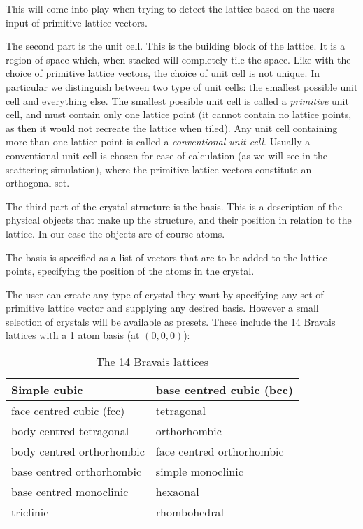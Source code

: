 \documentclass[main.tex]{subfiles}
\begin{document}
	This will come into play when trying to detect the lattice based on the users input of primitive lattice vectors. 
	
	The second part is the unit cell. This is the building block of the lattice. It is a region of space which, when stacked will completely tile the space. Like with the choice of primitive lattice vectors, the choice of unit cell is not unique. In particular we distinguish between two type of unit cells: the smallest possible unit cell and everything else. The smallest possible unit cell is called a \textit{primitive} unit cell, and must contain only one lattice point (it cannot contain no lattice points, as then it would not recreate the lattice when tiled). Any unit cell containing more than one lattice point is called a \textit{conventional unit cell}. Usually a conventional unit cell is chosen for ease of calculation (as we will see in the scattering simulation), where the primitive lattice vectors constitute an orthogonal set.
	
	The third part of the crystal structure is the basis. This is a description of the physical objects that make up the structure, and their position in relation to the lattice. In our case the objects are of course atoms. 
	
	The basis is specified as a list of vectors that are to be added to the lattice points, specifying the position of the atoms in the crystal.
	
	The user can create any type of crystal they want by specifying any set of primitive lattice vector and supplying any desired basis. However a small selection of crystals will be available as presets. These include the 14 Bravais lattices with a 1 atom basis (at $ (0,0,0) $):
	\begin{table}
		\centering
		\begin{tabular}{|l|l|}
			\hline
			Simple cubic & base centred cubic (bcc) \\
			\hline
			face centred cubic (fcc) & tetragonal \\
			\hline
			body centred tetragonal & orthorhombic \\
			\hline
			body centred orthorhombic & face centred orthorhombic \\
			\hline
			base centred orthorhombic & simple monoclinic \\
			\hline
			base centred monoclinic & hexaonal \\
			\hline
			triclinic & rhombohedral \\
			\hline
		\end{tabular}
		\caption{The 14 Bravais lattices}
		\label{tab:bravais}
	\end{table}
	
\end{document}
